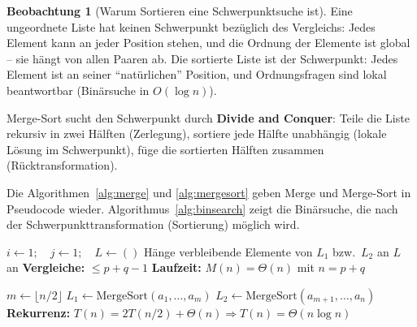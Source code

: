 ﻿\documentclass[a4paper,12pt]{report}
\theoremstyle{definition}
\newtheorem{beobachtung}{Beobachtung}
\begin{document}
\begin{beobachtung}[Warum Sortieren eine Schwerpunktsuche ist]
    Eine ungeordnete Liste hat keinen Schwerpunkt bezüglich des
    Vergleichs: Jedes Element kann an jeder Position stehen,
    und die Ordnung der Elemente ist global -- sie hängt von
    allen Paaren ab. Die sortierte Liste ist der Schwerpunkt:
    Jedes Element ist an seiner ``natürlichen'' Position,
    und Ordnungsfragen sind lokal beantwortbar (Binärsuche in $O(\log n)$).

    Merge-Sort sucht den Schwerpunkt durch \textbf{Divide and Conquer}:
    Teile die Liste rekursiv in zwei Hälften (Zerlegung), sortiere
    jede Hälfte unabhängig (lokale Lösung im Schwerpunkt),
    füge die sortierten Hälften zusammen (Rücktransformation).
\end{beobachtung}

Die Algorithmen~\ref{alg:merge} und \ref{alg:mergesort} geben Merge und Merge-Sort in Pseudocode wieder. Algorithmus~\ref{alg:binsearch} zeigt die Binärsuche, die nach der Schwerpunkttransformation (Sortierung) möglich wird.


\begin{algorithm}[H]
\DontPrintSemicolon
\caption{Merge}\label{alg:merge}
$i \leftarrow 1;\quad j \leftarrow 1;\quad L \leftarrow ()$\;
Hänge verbleibende Elemente von $L_1$ bzw.\ $L_2$ an $L$ an\;
\;
\BlankLine
\textbf{Vergleiche:} $\leq p + q - 1$ \quad \textbf{Laufzeit:} $M(n) = \Theta(n)$ mit $n = p + q$
\end{algorithm}

\begin{algorithm}[H]
\DontPrintSemicolon
\caption{Merge-Sort}\label{alg:mergesort}
$m \leftarrow \lfloor n/2 \rfloor$\;
$L_1 \leftarrow \mathrm{MergeSort}(a_1, \ldots, a_m)$ 
$L_2 \leftarrow \mathrm{MergeSort}(a_{m+1}, \ldots, a_n)$ 
 
\BlankLine
\textbf{Rekurrenz:} $T(n) = 2T(n/2) + \Theta(n)$\quad $\Rightarrow$\quad $T(n) = \Theta(n \log n)$
\end{algorithm}
\end{document}
